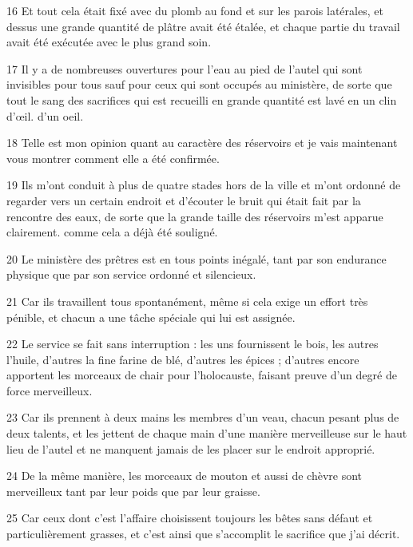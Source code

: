 \par 16 Et tout cela était fixé avec du plomb au fond et sur les parois latérales, et dessus une grande quantité de plâtre avait été étalée, et chaque partie du travail avait été exécutée avec le plus grand soin.

\par 17 Il y a de nombreuses ouvertures pour l'eau au pied de l'autel qui sont invisibles pour tous sauf pour ceux qui sont occupés au ministère, de sorte que tout le sang des sacrifices qui est recueilli en grande quantité est lavé en un clin d'œil. d'un oeil.

\par 18 Telle est mon opinion quant au caractère des réservoirs et je vais maintenant vous montrer comment elle a été confirmée.

\par 19 Ils m'ont conduit à plus de quatre stades hors de la ville et m'ont ordonné de regarder vers un certain endroit et d'écouter le bruit qui était fait par la rencontre des eaux, de sorte que la grande taille des réservoirs m'est apparue clairement. comme cela a déjà été souligné.

\par 20 Le ministère des prêtres est en tous points inégalé, tant par son endurance physique que par son service ordonné et silencieux.

\par 21 Car ils travaillent tous spontanément, même si cela exige un effort très pénible, et chacun a une tâche spéciale qui lui est assignée.

\par 22 Le service se fait sans interruption : les uns fournissent le bois, les autres l'huile, d'autres la fine farine de blé, d'autres les épices ; d'autres encore apportent les morceaux de chair pour l'holocauste, faisant preuve d'un degré de force merveilleux.

\par 23 Car ils prennent à deux mains les membres d'un veau, chacun pesant plus de deux talents, et les jettent de chaque main d'une manière merveilleuse sur le haut lieu de l'autel et ne manquent jamais de les placer sur le endroit approprié.

\par 24 De la même manière, les morceaux de mouton et aussi de chèvre sont merveilleux tant par leur poids que par leur graisse.

\par 25 Car ceux dont c'est l'affaire choisissent toujours les bêtes sans défaut et particulièrement grasses, et c'est ainsi que s'accomplit le sacrifice que j'ai décrit.

